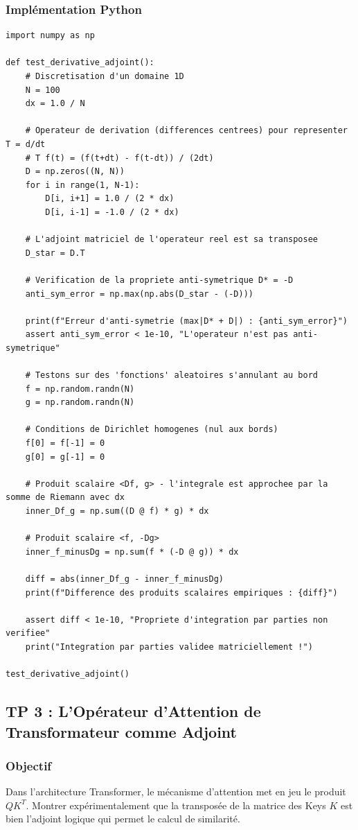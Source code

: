 \documentclass[11pt,a4paper]{article}
\begin{document}
\subsubsection*{Implémentation Python}
\begin{lstlisting}
import numpy as np

def test_derivative_adjoint():
    # Discretisation d'un domaine 1D
    N = 100
    dx = 1.0 / N

    # Operateur de derivation (differences centrees) pour representer T = d/dt
    # T f(t) = (f(t+dt) - f(t-dt)) / (2dt)
    D = np.zeros((N, N))
    for i in range(1, N-1):
        D[i, i+1] = 1.0 / (2 * dx)
        D[i, i-1] = -1.0 / (2 * dx)

    # L'adjoint matriciel de l'operateur reel est sa transposee
    D_star = D.T

    # Verification de la propriete anti-symetrique D* = -D
    anti_sym_error = np.max(np.abs(D_star - (-D)))

    print(f"Erreur d'anti-symetrie (max|D* + D|) : {anti_sym_error}")
    assert anti_sym_error < 1e-10, "L'operateur n'est pas anti-symetrique"

    # Testons sur des 'fonctions' aleatoires s'annulant au bord
    f = np.random.randn(N)
    g = np.random.randn(N)

    # Conditions de Dirichlet homogenes (nul aux bords)
    f[0] = f[-1] = 0
    g[0] = g[-1] = 0

    # Produit scalaire <Df, g> - l'integrale est approchee par la somme de Riemann avec dx
    inner_Df_g = np.sum((D @ f) * g) * dx

    # Produit scalaire <f, -Dg>
    inner_f_minusDg = np.sum(f * (-D @ g)) * dx

    diff = abs(inner_Df_g - inner_f_minusDg)
    print(f"Difference des produits scalaires empiriques : {diff}")

    assert diff < 1e-10, "Propriete d'integration par parties non verifiee"
    print("Integration par parties validee matriciellement !")

test_derivative_adjoint()
\end{lstlisting}


\subsection*{TP 3 : L'Opérateur d'Attention de Transformateur comme Adjoint}
\subsubsection*{Objectif}
Dans l'architecture Transformer, le mécanisme d'attention met en jeu le produit $Q K^T$. Montrer expérimentalement que la transposée de la matrice des Keys $K$ est bien l'adjoint logique qui permet le calcul de similarité.
\end{document}
